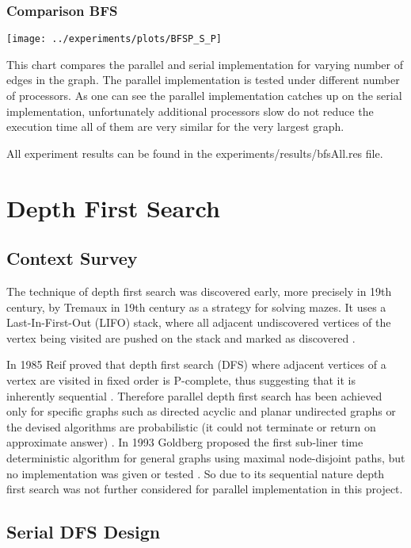 \documentclass{report}
\theoremstyle{plain}
\theoremstyle{definition}
\theoremstyle{remark}
\begin{document}
\subsection{Comparison BFS}

\texttt{[image: ../experiments/plots/BFSP\_S\_P]}

This chart compares the parallel and serial implementation for varying number of edges in the graph. The parallel implementation is tested under different number of processors. As one can see the parallel implementation catches up on the serial implementation, unfortunately additional processors slow do not reduce the execution time all of them are very similar for the very largest graph.

All experiment results can be found in the experiments/results/bfsAll.res file.

\chapter{Depth First Search}

\section{Context Survey}

The technique of depth first search was discovered  early, more precisely in 19th century, by Tremaux in 19th century as a strategy for solving mazes. It uses a Last-In-First-Out (LIFO) stack, where all adjacent undiscovered vertices of the vertex being visited are pushed on the stack and marked as discovered \cite{c++_sedgewick}.

In 1985 Reif proved that depth first search (DFS) where adjacent vertices of a vertex are visited in fixed order is P-complete, thus suggesting that it is inherently sequential \cite{reif1985depth}. Therefore parallel depth first search has been achieved only for specific graphs such as directed acyclic \cite{ghosh1984parallel} and planar undirected graphs \cite{hagerup1990planar} or the devised algorithms are probabilistic (it could not terminate or return on approximate answer) \cite{aggarwal1989parallel}. In 1993 Goldberg proposed the first sub-liner time deterministic algorithm for general graphs using maximal node-disjoint paths, but no implementation was given or tested \cite{goldberg1993sublinear}. So due to its sequential nature depth first search was not further considered for parallel implementation in this project.

\section{Serial DFS Design}
\end{document}
